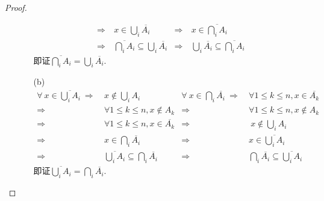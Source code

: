 \documentclass[UTF8]{ctexart}
\begin{document}
\begin{proof}
\begin{enumerate}
\begin{enumerate}
\begin{align*}
                    \Rightarrow\ & x \in \bigcup\limits_{i}\overline{A_i} & \Rightarrow\ & x \in \overline{\bigcap \limits_{i} A_i}\\
                    \Rightarrow\ & \overline{\bigcap \limits_{i} A_i} \subseteq \bigcup\limits_{i}\overline{A_i} & \Rightarrow\ & \bigcup\limits_{i}\overline{A_i} \subseteq \overline{\bigcap \limits_{i} A_i}
                \end{align*}
                即证$\overline{\bigcap \limits_{i} A_i}=\bigcup\limits_{i}\overline{A_i}$.
            \item [(b)]
            \begin{align*}
                \forall\ x \in \overline{\bigcup \limits_{i} A_i} \ \Rightarrow\ & x \notin  \bigcup \limits_{i} A_i & \forall\ x \in \bigcap\limits_{i}\overline{A_i} \ \Rightarrow\ & \forall 1 \leq k \leq n,x \in \overline{A_k}\\
                \Rightarrow\ & \forall 1 \leq k \leq n,x \notin A_k & \Rightarrow\ & \forall 1 \leq k \leq n,x \notin A_k\\
                \Rightarrow\ & \forall 1 \leq k \leq n,x \in \overline{A_k} & \Rightarrow &\ x \notin  \bigcup \limits_{i} A_i\\
                \Rightarrow\ & x \in \bigcap \limits_{i}\overline{A_i} & \Rightarrow\ & x \in \overline{\bigcup \limits_{i} A_i}\\
                \Rightarrow\ & \overline{\bigcup \limits_{i} A_i} \subseteq \bigcap\limits_{i}\overline{A_i} & \Rightarrow\ & \bigcap\limits_{i}\overline{A_i} \subseteq \overline{\bigcup \limits_{i} A_i}
            \end{align*}
            即证$\overline{\bigcup \limits_{i} A_i}=\bigcap\limits_{i}\overline{A_i}$.
        \end{enumerate}
    \end{enumerate}
\end{proof}
\end{document}
